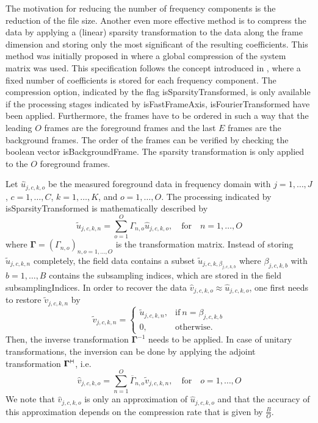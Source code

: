 \documentclass[landscape,a4paper]{article} %
\newcommand{\inlvar}[1]{{\ttfamily#1}}
\newcommand{\adj}{{\vdash \hspace*{-1.752mm} \dashv}}
\begin{document}
\begin{multicols}{2}
The motivation for reducing the number of frequency components is the reduction of the file size. Another even more effective method is to compress the data by applying a (linear) sparsity transformation to the data along the frame dimension and storing only the most significant of the resulting coefficients. This method was initially proposed in \cite{lampe2012fast} where a global compression of the system matrix was used. This specification follows the concept introduced in \cite{knopp2015compression}, where a fixed number of coefficients is stored for each frequency component. 
The compression option, indicated by the flag \inlvar{isSparsityTransformed}, is only available if the processing stages indicated by \inlvar{isFastFrameAxis}, \inlvar{isFourierTransformed} have been applied. Furthermore, the frames have to be ordered in such a way that the leading $O$ frames are the foreground frames and the last $E$ frames are the background frames. The order of the frames can be verified by checking the boolean vector \inlvar{isBackgroundFrame}. The sparsity transformation is only applied to the $O$ foreground frames. 

Let $\hat{u}_{j,c,k,o}$ be the measured foreground data in frequency domain with $j=1,\dots,J$, $c=1,\dots,C$, $k=1,\dots,K$, and $o=1,\dots,O$. The processing indicated by \inlvar{isSparsityTransformed} is mathematically described by 
\begin{equation*}
 \tilde{u}_{j,c,k,n} = \sum_{o=1}^{O} \Gamma_{n,o} \hat{u}_{j,c,k,o}, \quad \text{for} \quad n=1,\dots,O
\end{equation*}
where $\mathbf{\Gamma} = \left( \Gamma_{n,o} \right)_{n,o=1,\dots,O}$ is the transformation matrix.
Instead of storing $\tilde{u}_{j,c,k,n}$ completely, the field \inlvar{data} contains a subset $\tilde{u}_{j,c,k,\beta_{j,c,k,b}}$ where $\beta_{j,c,k,b}$ with $b=1,\dots,B$ contains the subsampling indices, which are stored in the field \inlvar{subsamplingIndices}. In order to recover the data $\hat{v}_{j,c,k,o} \approx \hat{u}_{j,c,k,o}$, one first needs to restore $\tilde{v}_{j,c,k,n}$ by 
\begin{equation*}
	\tilde{v}_{j,c,k,n} = 
	\begin{cases}
		\tilde{u}_{j,c,k,n}, & \text{if}\ n =\beta_{j,c,k,b} \\
		0, & \text{otherwise.}
	\end{cases}
\end{equation*}
Then, the inverse transformation $\mathbf{\Gamma}^{-1}$ needs to be applied. In case of unitary transformations, the inversion can be done by applying the adjoint transformation $\mathbf{\Gamma}^{\adj}$, i.e.
\begin{equation*}
 \hat{v}_{j,c,k,o} = \sum_{n=1}^{O} \overline{\Gamma}_{n,o} \tilde{v}_{j,c,k,n}, \quad \text{for} \quad o=1,\dots,O
\end{equation*}
We note that $\hat{v}_{j,c,k,o}$ is only an approximation of $\hat{u}_{j,c,k,o}$ and that the accuracy of this approximation depends on the compression rate that is given by $\frac{B}{O}$.


\end{multicols}
\end{document}
